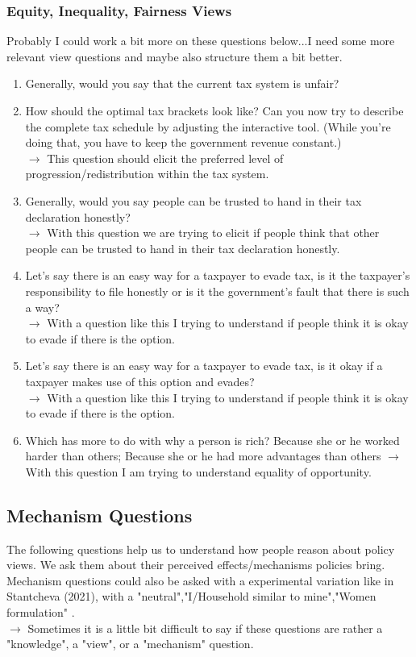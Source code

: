\documentclass[12pt]{article}
\begin{document}
\subsubsection{Equity, Inequality, Fairness Views}
Probably I could work a bit more on these questions below...I need some more relevant view questions and maybe also structure them a bit better. 
\begin{enumerate}
    \item Generally, would you say that the current tax system is unfair? 
    \item How should the optimal tax brackets look like? Can you now try to describe the complete tax schedule by adjusting the interactive tool. (While you're doing that, you have to keep the government revenue constant.) \\$\rightarrow$ This question should elicit the preferred level of progression/redistribution within the tax system. 
    \item Generally, would you say people can be trusted to hand in their tax declaration honestly? \\ $\rightarrow$ With this question we are trying to elicit if people think that other people can be trusted to hand in their tax declaration honestly.
    \item Let's say there is an easy way for a taxpayer to evade tax, is it the taxpayer's responsibility to file honestly or is it the government's fault that there is such a way?  \\ $\rightarrow$ With a question like this I trying to understand if people think it is okay to evade if there is the option.  
    \item Let's say there is an easy way for a taxpayer to evade tax, is it okay if a taxpayer makes use of this option and evades?  \\ $\rightarrow$ With a question like this I trying to understand if people think it is okay to evade if there is the option.
    \item Which has more to do with why a person is rich?  Because she or he worked harder than others; Because she or he had more advantages than others $\rightarrow$ With this question I am trying to understand equality of opportunity. 
\end{enumerate}

\subsection{Mechanism Questions}
The following questions help us to understand how people reason about policy views. We ask them about their perceived effects/mechanisms policies bring. Mechanism questions could also be asked with a experimental variation like in Stantcheva (2021), with a "neutral","I/Household similar to mine","Women formulation" . \\ $\rightarrow$ Sometimes it is a little bit difficult to say if these questions are rather a "knowledge", a "view", or a "mechanism" question. 
\end{document}
